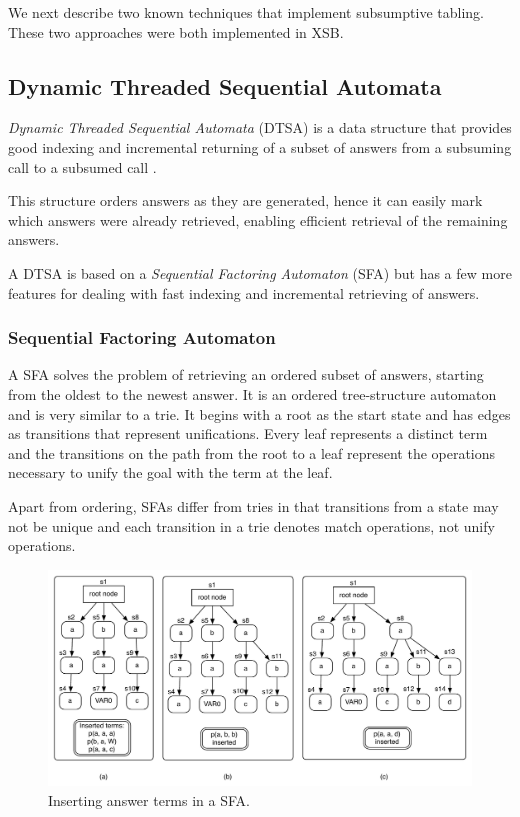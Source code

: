 We next describe two known techniques that implement subsumptive tabling. These two approaches were
both implemented in XSB.

\subsection{Dynamic Threaded Sequential Automata}\label{sec:dtsa}

\textit{Dynamic Threaded Sequential Automata} (DTSA) is a data structure that provides good indexing
and incremental returning of a subset of answers from a subsuming call to a subsumed call \cite{Rao-96}.

This structure orders answers as they are generated, hence it can easily mark which answers were
already retrieved, enabling efficient retrieval of the remaining answers.

A DTSA is based on a \textit{Sequential Factoring Automaton} (SFA) \cite{Dawnson-95} but has a few more
features for dealing with fast indexing and incremental retrieving of answers.

\subsubsection{Sequential Factoring Automaton}

A SFA solves the problem of retrieving an ordered subset of answers, starting from the oldest to the
newest answer. It is an ordered tree-structure automaton and is very similar to a trie. It begins with
a root as the start state and has edges as transitions that represent unifications. Every leaf represents
a distinct term and the transitions on the path from the root to a leaf represent the operations necessary
to unify the goal with the term at the leaf.

Apart from ordering, SFAs differ from tries in that transitions from a state may not be unique and each
transition in a trie denotes match operations, not unify operations.

\begin{figure}[ht]
  \centering
    \includegraphics[scale=0.6]{sfa.pdf}
  \caption{Inserting answer terms in a SFA.}
  \label{fig:sfa_example}
\end{figure}

